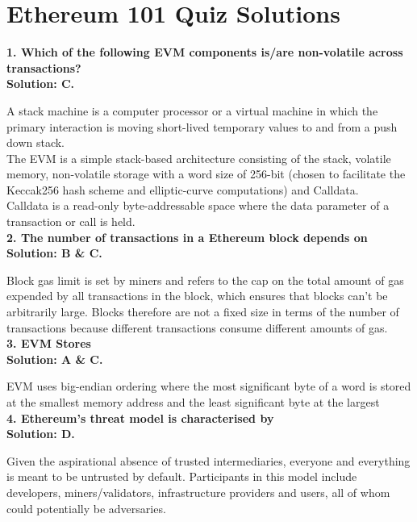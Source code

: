 \section{Ethereum 101 Quiz Solutions}

\textbf{1. Which of the following EVM components is/are non-volatile across transactions?}\label{sec:exam1_q1}\\

\textbf{Solution: C.}

A stack machine is a computer processor or a virtual machine in which the primary interaction is moving short-lived temporary values to and from a push down stack.\\

The EVM is a simple stack-based architecture consisting of the stack, volatile memory, non-volatile storage with a word size of 256-bit (chosen to facilitate the Keccak256 hash scheme and elliptic-curve computations) and Calldata.\\

Calldata is a read-only byte-addressable space where the data parameter of a transaction or call is held.\\

\textbf{2. The number of transactions in a Ethereum block depends on}\label{sec:exam1_q2}\\

\textbf{Solution: B \& C.}

Block gas limit is set by miners and refers to the cap on the total amount of gas expended by all transactions in the block, which ensures that blocks can't be arbitrarily large.
Blocks therefore are not a fixed size in terms of the number of transactions because different transactions consume different amounts of gas.\\

\textbf{3. EVM Stores}\label{sec:exam1_q3}\\

\textbf{Solution: A \& C.}

EVM uses big-endian ordering where the most significant byte of a word is stored at the smallest memory address and the least significant byte at the largest\\

\textbf{4. Ethereum's threat model is characterised by}\label{sec:exam1_q4}\\

\textbf{Solution: D.}

Given the aspirational absence of trusted intermediaries, everyone and everything is meant to be untrusted by default.
Participants in this model include developers, miners/validators, infrastructure providers and users, all of whom could potentially be adversaries.\\

